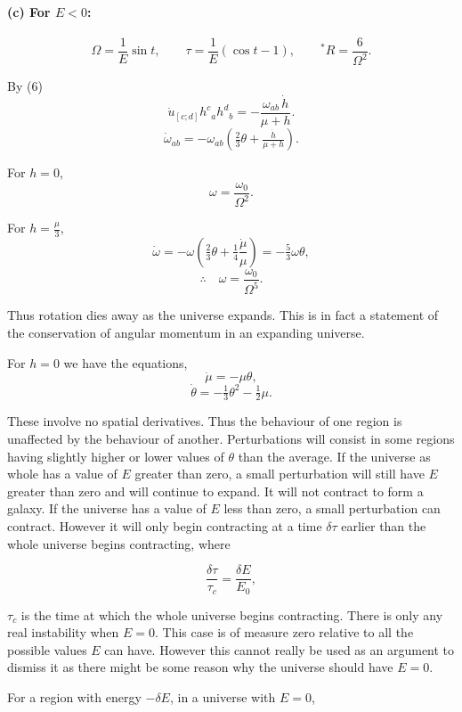 \paragraph{(c) For $E < 0$:}
\[
\Omega = \frac{1}{E}\sin t, 
\qquad \tau = \frac{1}{E}(\cos t - 1), 
\qquad {}^{*}R = \frac{6}{\Omega^{2}}.
\]


By (6)
\[
\dot{u}_{[c;d]} h^{c}{}_{a} h^{d}{}_{b} 
   = -\frac{\omega_{ab}\,\dot{h}}{\mu + h}.
\]
\[
\dot{\omega}_{ab} = -\omega_{ab}\left(\tfrac{2}{3}\theta + \tfrac{\dot{h}}{\mu + h}\right).
\]

For $h = 0$,
\[
\omega = \frac{\omega_{0}}{\Omega^{2}}.
\]

For $h = \tfrac{\mu}{3}$,
\[
\dot{\omega} = -\omega\left(\tfrac{2}{3}\theta + \tfrac{1}{4}\frac{\dot{\mu}}{\mu}\right)
= -\tfrac{5}{3}\omega\theta,
\]
\[
\therefore \quad \omega = \frac{\omega_{0}}{\Omega^{5}}.
\]

Thus rotation dies away as the universe expands.  
This is in fact a statement of the conservation of angular momentum in an expanding universe.


For $h = 0$ we have the equations,
\[
\dot{\mu} = -\mu\theta,
\]
\[
\dot{\theta} = -\tfrac{1}{3}\theta^{2} - \tfrac{1}{2}\mu.
\]

These involve no spatial derivatives. Thus the behaviour of one 
region is unaffected by the behaviour of another. Perturbations 
will consist in some regions having slightly higher or lower values 
of $\theta$ than the average. If the universe as whole has a value of $E$ 
greater than zero, a small perturbation will still have $E$ greater 
than zero and will continue to expand. It will not contract to form a galaxy. If the universe has a value of $E$ less than zero, a 
small perturbation can contract. However it will only begin 
contracting at a time $\delta\tau$ earlier than the whole universe begins 
contracting, where  

\[
\frac{\delta\tau}{\tau_{c}} = \frac{\delta E}{E_{0}},
\]

$\tau_{c}$ is the time at which the whole universe begins contracting.  
There is only any real instability when $E=0$. This case is of 
measure zero relative to all the possible values $E$ can have.  
However this cannot really be used as an argument to dismiss it 
as there might be some reason why the universe should have $E=0$.

For a region with energy $- \delta E$, in a universe with $E=0$,

